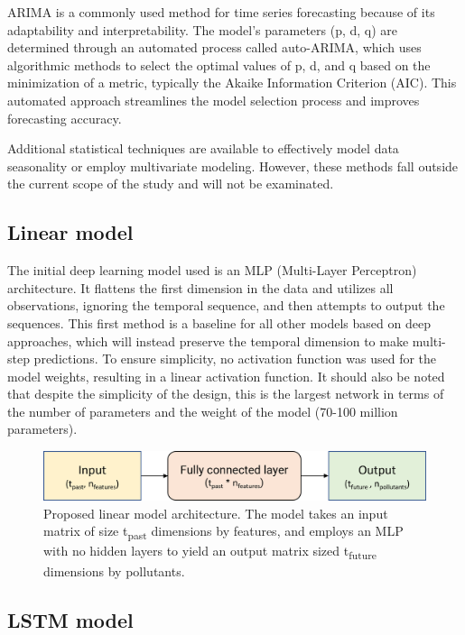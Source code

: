 ARIMA is a commonly used method for time series forecasting because of its adaptability and interpretability. The model's parameters (p, d, q) are determined through an automated process called auto-ARIMA, which uses algorithmic methods to select the optimal values of p, d, and q based on the minimization of a metric, typically the Akaike Information Criterion (AIC). This automated approach streamlines the model selection process and improves forecasting accuracy.

Additional statistical techniques are available to effectively model data seasonality or employ multivariate modeling. However, these methods fall outside the current scope of the study and will not be examinated.

\subsection*{Linear model}

The initial deep learning model used is an MLP (Multi-Layer Perceptron) architecture. It flattens the first dimension in the data and utilizes all observations, ignoring the temporal sequence, and then attempts to output the sequences. This first method is a baseline for all other models based on deep approaches, which will instead preserve the temporal dimension to make multi-step predictions.
To ensure simplicity, no activation function was used for the model weights, resulting in a linear activation function. It should also be noted that despite the simplicity of the design, this is the largest network in terms of the number of parameters and the weight of the model (70-100 million parameters).

\begin{figure}
    \centering
    \includegraphics[width=0.7\linewidth]{images/model architectures/linearmodel.png}
    \caption{Proposed linear model architecture. The model takes an input matrix of size t\textsubscript{past} dimensions by features, and employs an MLP with no hidden layers to yield an output matrix sized t\textsubscript{future} dimensions by pollutants.}
    \label{fig:linearmodel}
\end{figure}

\subsection*{LSTM model}

